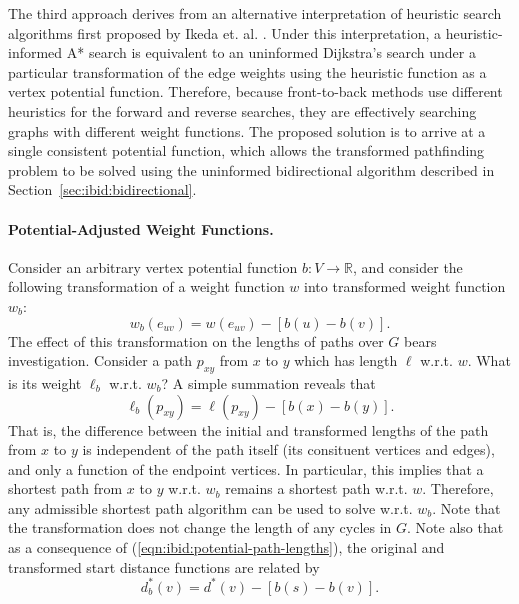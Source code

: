 The third approach
derives from an alternative interpretation of heuristic search
algorithms first proposed by Ikeda et. al.
\citep{ikeda1994betterroutes}.
Under this interpretation,
a heuristic-informed A* search is equivalent to an uninformed
Dijkstra's search under a particular transformation
of the edge weights using the heuristic function
as a vertex potential function.
Therefore,
because front-to-back methods use different heuristics for the
forward and reverse searches,
they are effectively searching graphs with different weight functions.
The proposed solution is to arrive at a single consistent potential
function,
which allows the transformed pathfinding problem to be solved using
the uninformed bidirectional algorithm described
in Section~\ref{sec:ibid:bidirectional}.

\paragraph{Potential-Adjusted Weight Functions.}
Consider an arbitrary vertex potential function
$b : V \rightarrow \mathbb{R}$,
and consider the following transformation of a weight
function $w$ into transformed weight function $w_b$:
\begin{equation}
   w_b(e_{uv}) = w(e_{uv}) - \left[ b(u) - b(v) \right].
   \label{eqn:ibid:potential-transformation}
\end{equation}
The effect of this transformation on the lengths of paths over $G$
bears investigation.
Consider a path $p_{xy}$ from $x$ to $y$ which has length $\ell$ w.r.t. $w$.
What is its weight $\ell_b$ w.r.t. $w_b$?
A simple summation reveals that
\begin{equation}
   \ell_b(p_{xy}) = \ell(p_{xy}) - \left[ b(x) - b(y) \right].
   \label{eqn:ibid:potential-path-lengths}
\end{equation}
That is, the difference between the initial and transformed lengths
of the path from $x$ to $y$ is independent of the path itself
(its consituent vertices and edges),
and only a function of the endpoint vertices.
In particular,
this implies that a shortest path from $x$ to $y$ w.r.t. $w_b$
remains a shortest path w.r.t. $w$.
Therefore, any admissible shortest path algorithm can be used to
solve w.r.t. $w_b$.
Note that the transformation does not change the length of any
cycles in $G$.
Note also that as a consequence of
(\ref{eqn:ibid:potential-path-lengths}),
the original and transformed start distance functions are related by
\begin{equation}
   d^*_b(v) = d^*(v) - \left[ b(s) - b(v) \right].
\end{equation}

